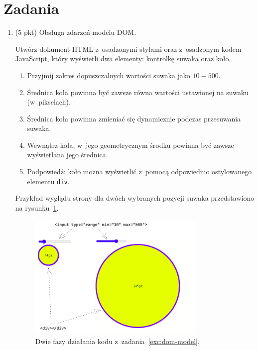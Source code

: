 \documentclass[12pt]{article}
\begin{document}
    \section*{Zadania}
        \begin{enumerate}
        \item\label{exc:dom-model}
            (5 pkt) Obsługa zdarzeń modelu DOM.

            Utwórz dokument HTML z~osadzonymi stylami oraz z~osadzonym kodem JavaScript, który wyświetli dwa elementy: kontrolkę suwaka oraz koło.

            \begin{enumerate}
                \item Przyjmij zakres dopuszczalnych wartości suwaka jako $10 - 500$.
                \item Średnica koła powinna być zawsze równa wartości ustawionej na suwaku (w~pikselach).
                \item Średnica koła powinna zmieniać się dynamicznie podczas przesuwania suwaka.
                \item Wewnątrz koła, w~jego geometrycznym środku powinna być zawsze wyświetlana jego średnica.
                \item Podpowiedź: koło można wyświetlić z~pomocą odpowiednio ostylowanego elementu \texttt{div}.
            \end{enumerate}

            Przykład wyglądu strony dla dwóch wybranych pozycji suwaka przedstawiono na rysunku~\ref{fig:dom-model}.

            \begin{figure}[p]
                \centering
                \includegraphics[width=0.8\textwidth]{lista-2-1}
                \caption{Dwie fazy działania kodu z~zadania~\ref{exc:dom-model}.}
                \label{fig:dom-model}
            \end{figure}

    \end{enumerate}
\end{document}
